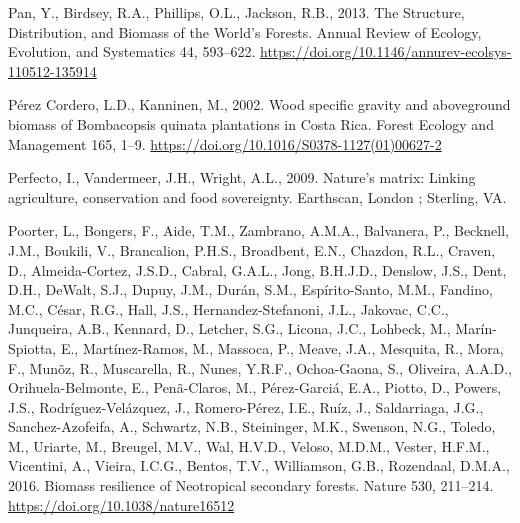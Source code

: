 \documentclass[
  12pt,
]{article}
\newlength{\cslhangindent}
\newlength{\cslentryspacingunit} %
\newenvironment{CSLReferences}[2] %
 {%
  \setlength{\parindent}{0pt}
  \ifodd #1
  \let\oldpar\par
  \def\par{\hangindent=\cslhangindent\oldpar}
  \fi
  \setlength{\parskip}{#2\cslentryspacingunit}
 }%
 {}
\begin{document}
\begin{CSLReferences}{1}{0}
\leavevmode{}%
Pan, Y., Birdsey, R.A., Phillips, O.L., Jackson, R.B., 2013. The {Structure}, {Distribution}, and {Biomass} of the {World}'s {Forests}. Annual Review of Ecology, Evolution, and Systematics 44, 593--622. \url{https://doi.org/10.1146/annurev-ecolsys-110512-135914}

\leavevmode{}%
Pérez Cordero, L.D., Kanninen, M., 2002. Wood specific gravity and aboveground biomass of {Bombacopsis} quinata plantations in {Costa Rica}. Forest Ecology and Management 165, 1--9. \url{https://doi.org/10.1016/S0378-1127(01)00627-2}

\leavevmode{}%
Perfecto, I., Vandermeer, J.H., Wright, A.L., 2009. Nature's matrix: Linking agriculture, conservation and food sovereignty. {Earthscan}, {London ; Sterling, VA}.

\leavevmode{}%
Poorter, L., Bongers, F., Aide, T.M., Zambrano, A.M.A., Balvanera, P., Becknell, J.M., Boukili, V., Brancalion, P.H.S., Broadbent, E.N., Chazdon, R.L., Craven, D., Almeida-Cortez, J.S.D., Cabral, G.A.L., Jong, B.H.J.D., Denslow, J.S., Dent, D.H., DeWalt, S.J., Dupuy, J.M., Durán, S.M., Espírito-Santo, M.M., Fandino, M.C., César, R.G., Hall, J.S., Hernandez-Stefanoni, J.L., Jakovac, C.C., Junqueira, A.B., Kennard, D., Letcher, S.G., Licona, J.C., Lohbeck, M., Marín-Spiotta, E., Martínez-Ramos, M., Massoca, P., Meave, J.A., Mesquita, R., Mora, F., Munõz, R., Muscarella, R., Nunes, Y.R.F., Ochoa-Gaona, S., Oliveira, A.A.D., Orihuela-Belmonte, E., Penã-Claros, M., Pérez-Garciá, E.A., Piotto, D., Powers, J.S., Rodríguez-Velázquez, J., Romero-Pérez, I.E., Ruíz, J., Saldarriaga, J.G., Sanchez-Azofeifa, A., Schwartz, N.B., Steininger, M.K., Swenson, N.G., Toledo, M., Uriarte, M., Breugel, M.V., Wal, H.V.D., Veloso, M.D.M., Vester, H.F.M., Vicentini, A., Vieira, I.C.G., Bentos, T.V., Williamson, G.B., Rozendaal, D.M.A., 2016. Biomass resilience of {Neotropical} secondary forests. Nature 530, 211--214. \url{https://doi.org/10.1038/nature16512}


\end{CSLReferences}
\end{document}
